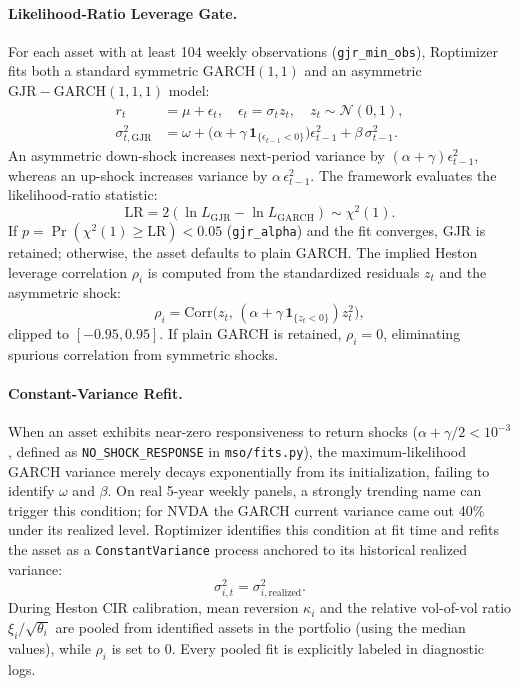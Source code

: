 \documentclass[11pt]{article}
\newcommand{\Corr}{\mathrm{Corr}}
\begin{document}
\paragraph{Likelihood-Ratio Leverage Gate.}
For each asset with at least 104 weekly observations (\texttt{gjr\_min\_obs}), Roptimizer fits both a standard
symmetric $\mathrm{GARCH}(1,1)$ and an asymmetric $\mathrm{GJR-GARCH}(1,1,1)$ model:
\begin{align}
r_t &= \mu + \epsilon_t, \quad \epsilon_t = \sigma_t z_t, \quad z_t \sim \mathcal{N}(0, 1), \\
\sigma_{t,\mathrm{GJR}}^2 &= \omega + \big(\alpha + \gamma\,\mathbf{1}_{\{\epsilon_{t-1} < 0\}}\big)\epsilon_{t-1}^2 + \beta\,\sigma_{t-1}^2.
\end{align}
An asymmetric down-shock increases next-period variance by $(\alpha + \gamma)\epsilon_{t-1}^2$, whereas an
up-shock increases variance by $\alpha\,\epsilon_{t-1}^2$. The framework evaluates the likelihood-ratio statistic:
\begin{equation}
\mathrm{LR} = 2\left(\ln L_{\mathrm{GJR}} - \ln L_{\mathrm{GARCH}}\right) \sim \chi^2(1).
\end{equation}
If $p = \Pr(\chi^2(1) \ge \mathrm{LR}) < 0.05$ (\texttt{gjr\_alpha}) and the fit converges, GJR is retained;
otherwise, the asset defaults to plain GARCH. The implied Heston leverage correlation $\rho_i$ is computed
from the standardized residuals $z_t$ and the asymmetric shock:
\begin{equation}
\rho_i = \Corr\big(z_t,\, (\alpha + \gamma\,\mathbf{1}_{\{z_t < 0\}}) z_t^2\big),
\end{equation}
clipped to $[-0.95, 0.95]$. If plain GARCH is retained, $\rho_i = 0$, eliminating spurious correlation from
symmetric shocks.

\paragraph{Constant-Variance Refit.}
When an asset exhibits near-zero responsiveness to return shocks ($\alpha + \gamma/2 < 10^{-3}$, defined as
\texttt{NO\_SHOCK\_RESPONSE} in \texttt{mso/fits.py}), the maximum-likelihood $\mathrm{GARCH}$ variance
merely decays exponentially from its initialization, failing to identify $\omega$ and $\beta$. On real 5-year
weekly panels, a strongly trending name can trigger this condition; for NVDA the GARCH
current variance came out 40\% under its realized level. Roptimizer identifies this condition at fit
time and refits the asset as a \texttt{ConstantVariance} process anchored to its historical realized variance:
\begin{equation}
\sigma_{i, t}^2 = \sigma_{i, \mathrm{realized}}^2.
\end{equation}
During Heston CIR calibration, mean reversion $\kappa_i$ and the relative vol-of-vol ratio
$\xi_i / \sqrt{\theta_i}$ are pooled from identified assets in the portfolio (using the median values),
while $\rho_i$ is set to 0. Every pooled fit is explicitly labeled in diagnostic logs.
\end{document}
